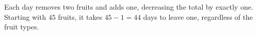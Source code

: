 Each day removes two fruits and adds one, decreasing the total by exactly one. Starting with $45$ fruits, it takes $45-1=\boxed{44}$ days to leave one, regardless of the fruit types.
